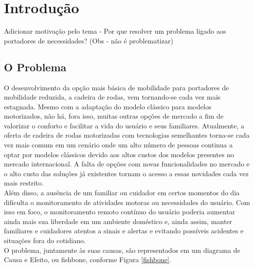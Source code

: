 \chapter{Introdução}

Adicionar motivação pelo tema - Por que resolver um problema ligado aos portadores de necessidades? (Obs - não é problematizar)

\section{O Problema}

	O desenvolvimento da opção mais básica de mobilidade para portadores de mobilidade reduzida, a cadeira de rodas, vem tornando-se cada vez mais estagnada. Mesmo com a adaptação do modelo clássico para modelos motorizados, não há, fora isso, muitas outras opções de mercado a fim de valorizar o conforto e facilitar a vida do usuário e seus familiares. Atualmente, a oferta de cadeira de rodas motorizadas com tecnologias semelhantes torna-se cada vez mais comum em um cenário onde um alto número de pessoas continua a optar por modelos clássicos devido aos altos custos dos modelos presentes no mercado internacional. A falta de opções com novas funcionalidades no mercado e o alto custo das soluções já existentes tornam o acesso a essas novidades cada vez mais restrito.\\
	
	Além disso, a ausência de um familiar ou cuidador em certos momentos do dia dificulta o monitoramento de atividades motoras ou necessidades do usuário. Com isso em foco, o monitoramento remoto contínuo do usuário poderia aumentar ainda mais sua liberdade em um ambiente doméstico e, ainda assim, manter familiares e cuidadores atentos a sinais e alertas e evitando possíveis acidentes e situações fora do cotidiano.\\
	
	O problema, juntamente às suas causas, são representados em um diagrama de Causa e Efeito, ou fishbone, conforme Figura \ref{fishbone}.
	
